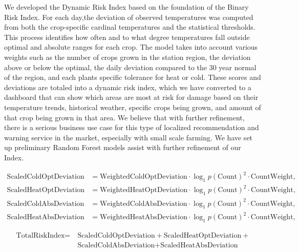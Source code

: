 \documentclass{article}
\begin{document}
We developed the Dynamic Risk Index based on the foundation of the Binary Risk Index. For each day,the deviation of observed temperatures was computed from both the crop-specific cardinal temperatures and the statistical thresholds. This process identifies how often and to what degree temperatures fall outside optimal and absolute ranges for each crop. The model takes into account various weights such as the number of crops grown in the station region, the deviation above or below the optimal, the daily deviation compared to the 30 year normal of the region, and each plants specific tolerance for heat or cold. These scores and deviations are totaled into a dynamic risk index, which we have converted to a dashboard that can show which areas are most at risk for damage based on their temperature trends, historical weather, specific crops being grown, and amount of that crop being grown in that area.  We believe that with further refinement, there is a serious business use case for this type of localized recommendation and warning service in the market, especially with small scale farming.  We have set up preliminary Random Forest models assist with further refinement of our Index.

\begin{align}
\text{ScaledColdOptDeviation} &= \text{WeightedColdOptDeviation} \cdot \log_1p(\text{Count})^2 \cdot \text{CountWeight}, \\
\text{ScaledHeatOptDeviation} &= \text{WeightedHeatOptDeviation} \cdot \log_1p(\text{Count})^2 \cdot \text{CountWeight}, \\
\text{ScaledColdAbsDeviation} &= \text{WeightedColdAbsDeviation} \cdot \log_1p(\text{Count})^2 \cdot \text{CountWeight}, \\
\text{ScaledHeatAbsDeviation} &= \text{WeightedHeatAbsDeviation} \cdot \log_1p(\text{Count})^2 \cdot \text{CountWeight},
\end{align}

\begin{equation}
\begin{split}
\text{TotalRiskIndex} = & \ \text{ScaledColdOptDeviation} + \text{ScaledHeatOptDeviation} + \\
                        & \ \text{ScaledColdAbsDeviation} + \text{ScaledHeatAbsDeviation}
\end{split}
\end{equation}
\end{document}
